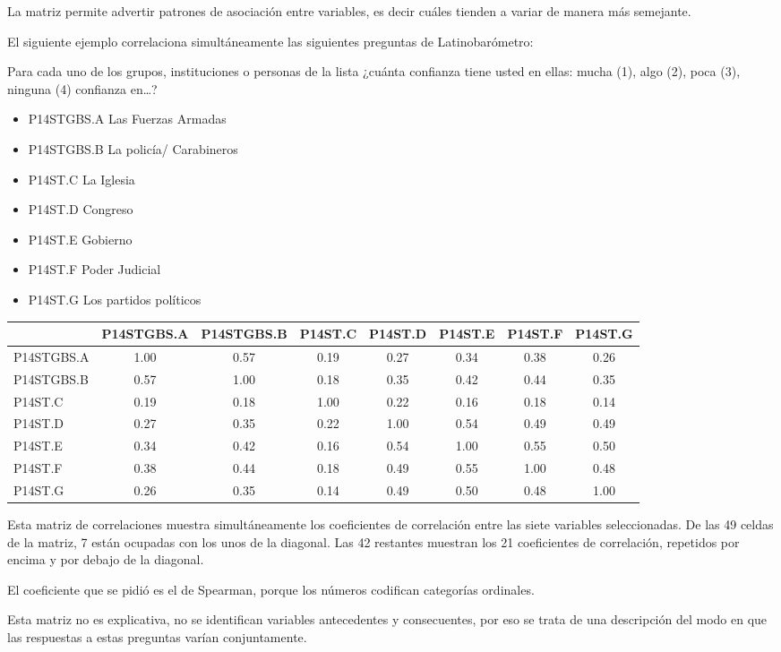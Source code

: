 \documentclass[]{book}
\providecommand{\tightlist}{%
  \setlength{\itemsep}{0pt}\setlength{\parskip}{0pt}}
\begin{document}
La matriz permite advertir patrones de asociación entre variables, es decir cuáles tienden a variar de manera más semejante.

El siguiente ejemplo correlaciona simultáneamente las siguientes preguntas de Latinobarómetro:

Para cada uno de los grupos, instituciones o personas de la lista ¿cuánta confianza tiene usted en ellas: mucha (1), algo (2), poca (3), ninguna (4) confianza en\ldots{}?

\begin{itemize}
\tightlist
\item
  P14STGBS.A Las Fuerzas Armadas
\item
  P14STGBS.B La policía/ Carabineros
\item
  P14ST.C La Iglesia
\item
  P14ST.D Congreso
\item
  P14ST.E Gobierno
\item
  P14ST.F Poder Judicial
\item
  P14ST.G Los partidos políticos
\end{itemize}

\begin{longtable}[]{@{}lccccccc@{}}
\toprule
& P14STGBS.A & P14STGBS.B & P14ST.C & P14ST.D & P14ST.E & P14ST.F & P14ST.G\tabularnewline
\midrule
\endhead
P14STGBS.A & 1.00 & 0.57 & 0.19 & 0.27 & 0.34 & 0.38 & 0.26\tabularnewline
P14STGBS.B & 0.57 & 1.00 & 0.18 & 0.35 & 0.42 & 0.44 & 0.35\tabularnewline
P14ST.C & 0.19 & 0.18 & 1.00 & 0.22 & 0.16 & 0.18 & 0.14\tabularnewline
P14ST.D & 0.27 & 0.35 & 0.22 & 1.00 & 0.54 & 0.49 & 0.49\tabularnewline
P14ST.E & 0.34 & 0.42 & 0.16 & 0.54 & 1.00 & 0.55 & 0.50\tabularnewline
P14ST.F & 0.38 & 0.44 & 0.18 & 0.49 & 0.55 & 1.00 & 0.48\tabularnewline
P14ST.G & 0.26 & 0.35 & 0.14 & 0.49 & 0.50 & 0.48 & 1.00\tabularnewline
\bottomrule
\end{longtable}

Esta matriz de correlaciones muestra simultáneamente los coeficientes de correlación entre las siete variables seleccionadas. De las 49 celdas de la matriz, 7 están ocupadas con los unos de la diagonal. Las 42 restantes muestran los 21 coeficientes de correlación, repetidos por encima y por debajo de la diagonal.

El coeficiente que se pidió es el de Spearman, porque los números codifican categorías ordinales.

Esta matriz no es explicativa, no se identifican variables antecedentes y consecuentes, por eso se trata de una descripción del modo en que las respuestas a estas preguntas varían conjuntamente.
\end{document}
